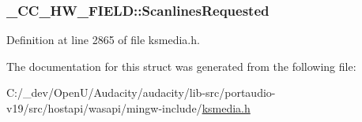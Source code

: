 \subsubsection[{\texorpdfstring{Scanlines\+Requested}{ScanlinesRequested}}]{ \+\_\+\+C\+C\+\_\+\+H\+W\+\_\+\+F\+I\+E\+L\+D\+::\+Scanlines\+Requested}\hypertarget{struct___c_c___h_w___f_i_e_l_d_a3c80b9397cf44d714e44b016984ba4d4}{}\label{struct___c_c___h_w___f_i_e_l_d_a3c80b9397cf44d714e44b016984ba4d4}


Definition at line 2865 of file ksmedia.\+h.



The documentation for this struct was generated from the following file\+:\begin{DoxyCompactItemize}
\item 
C\+:/\+\_\+dev/\+Open\+U/\+Audacity/audacity/lib-\/src/portaudio-\/v19/src/hostapi/wasapi/mingw-\/include/\hyperlink{ksmedia_8h}{ksmedia.\+h}\end{DoxyCompactItemize}
